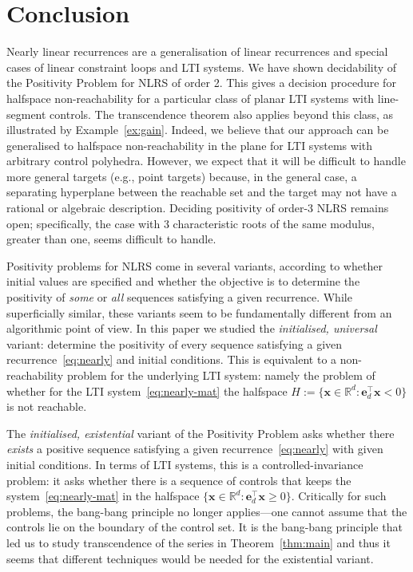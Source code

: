 \documentclass[a4paper,UKenglish,cleveref, autoref, thm-restate]{lipics-v2021}
\begin{document}
\section{Conclusion}
\label{sec:conclusion}
Nearly linear recurrences are a generalisation of linear recurrences and 
special cases of linear constraint loops and LTI systems.   
We have shown decidability of the Positivity Problem for NLRS
of order 2. This gives a decision procedure for halfspace
non-reachability for a particular class of planar LTI systems
with line-segment controls. The transcendence theorem also
applies beyond this class, as illustrated by
Example~\ref{ex:gain}.  Indeed,
we believe that our approach can be generalised to halfspace non-reachability in the plane for LTI systems 
with arbitrary control polyhedra.  However, we expect that it will be difficult to handle more general targets (e.g., point targets)
because, in the general case, a separating hyperplane between the reachable set and the target may not have a rational or algebraic description.  
Deciding positivity of order-3 NLRS remains open; specifically, the case with 3 characteristic roots of the same modulus, greater than one, seems 
difficult to handle.  

Positivity problems for NLRS come in several variants, according to whether initial values are specified and whether the objective is to determine  
the positivity of \emph{some} or \emph{all} sequences satisfying a given recurrence.  
While superficially similar,
these variants seem to be fundamentally different from an algorithmic point of view.
In this paper we studied the \emph{initialised, universal} variant: 
determine the positivity of every sequence satisfying a given 
recurrence~\eqref{eq:nearly} and initial conditions.
This is equivalent to a non-reachability problem for the underlying
LTI system: namely the problem of whether for the LTI system~\eqref{eq:nearly-mat} the 
halfspace $H:=\{ \boldsymbol x \in \mathbb R^d : \boldsymbol e_d^\top
\boldsymbol x < 0\}$ is not reachable.

The \emph{initialised, existential} variant of the Positivity Problem
asks whether there \emph{exists} a positive  sequence satisfying a given
recurrence~\eqref{eq:nearly} with given initial conditions.  In terms of LTI systems,
this is a controlled-invariance problem: it asks whether there is a sequence of controls that
keeps the system~\eqref{eq:nearly-mat} in the halfspace $\{\boldsymbol x \in \mathbb R^d: \boldsymbol e_d^\top \boldsymbol x\geq 0\}$.  Critically for such
problems, the bang-bang principle no longer applies---one cannot
assume that the controls lie on the boundary of the control set.
It is the bang-bang principle that led us to study transcendence of the series in Theorem~\ref{thm:main} and thus 
it seems that different techniques would be 
needed for the existential variant.
\end{document}
